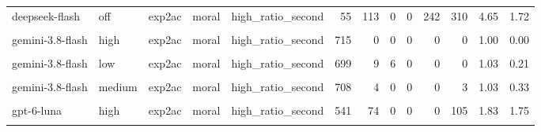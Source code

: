\documentclass[
]{article}
\begin{document}
\begin{table}[!h]
{\begin{tabular}[t]{lllllrrrrrrrr}
deepseek-flash & off & exp2ac & moral & high\_ratio\_second & 55 & 113 & 0 & 0 & 242 & 310 & 4.65 & 1.72\\
\cellcolor{gray!10}{gemini-3.8-flash} & \cellcolor{gray!10}{high} & \cellcolor{gray!10}{exp2ac} & \cellcolor{gray!10}{moral} & \cellcolor{gray!10}{high\_ratio\_first} & \cellcolor{gray!10}{698} & \cellcolor{gray!10}{0} & \cellcolor{gray!10}{14} & \cellcolor{gray!10}{0} & \cellcolor{gray!10}{0} & \cellcolor{gray!10}{8} & \cellcolor{gray!10}{1.09} & \cellcolor{gray!10}{0.59}\\
gemini-3.8-flash & high & exp2ac & moral & high\_ratio\_second & 715 & 0 & 0 & 0 & 0 & 0 & 1.00 & 0.00\\
\addlinespace
\cellcolor{gray!10}{gemini-3.8-flash} & \cellcolor{gray!10}{low} & \cellcolor{gray!10}{exp2ac} & \cellcolor{gray!10}{moral} & \cellcolor{gray!10}{high\_ratio\_first} & \cellcolor{gray!10}{686} & \cellcolor{gray!10}{14} & \cellcolor{gray!10}{5} & \cellcolor{gray!10}{2} & \cellcolor{gray!10}{4} & \cellcolor{gray!10}{9} & \cellcolor{gray!10}{1.13} & \cellcolor{gray!10}{0.68}\\
gemini-3.8-flash & low & exp2ac & moral & high\_ratio\_second & 699 & 9 & 6 & 0 & 0 & 0 & 1.03 & 0.21\\
\cellcolor{gray!10}{gemini-3.8-flash} & \cellcolor{gray!10}{medium} & \cellcolor{gray!10}{exp2ac} & \cellcolor{gray!10}{moral} & \cellcolor{gray!10}{high\_ratio\_first} & \cellcolor{gray!10}{686} & \cellcolor{gray!10}{1} & \cellcolor{gray!10}{5} & \cellcolor{gray!10}{2} & \cellcolor{gray!10}{2} & \cellcolor{gray!10}{20} & \cellcolor{gray!10}{1.17} & \cellcolor{gray!10}{0.88}\\
gemini-3.8-flash & medium & exp2ac & moral & high\_ratio\_second & 708 & 4 & 0 & 0 & 0 & 3 & 1.03 & 0.33\\
\cellcolor{gray!10}{gpt-6-luna} & \cellcolor{gray!10}{high} & \cellcolor{gray!10}{exp2ac} & \cellcolor{gray!10}{moral} & \cellcolor{gray!10}{high\_ratio\_first} & \cellcolor{gray!10}{640} & \cellcolor{gray!10}{12} & \cellcolor{gray!10}{0} & \cellcolor{gray!10}{0} & \cellcolor{gray!10}{25} & \cellcolor{gray!10}{43} & \cellcolor{gray!10}{1.45} & \cellcolor{gray!10}{1.36}\\
\addlinespace
gpt-6-luna & high & exp2ac & moral & high\_ratio\_second & 541 & 74 & 0 & 0 & 0 & 105 & 1.83 & 1.75\\
\cellcolor{gray!10}{gpt-6-luna} & \cellcolor{gray!10}{low} & \cellcolor{gray!10}{exp2ac} & \cellcolor{gray!10}{moral} & \cellcolor{gray!10}{high\_ratio\_first} & \cellcolor{gray!10}{611} & \cellcolor{gray!10}{11} & \cellcolor{gray!10}{2} & \cellcolor{gray!10}{1} & \cellcolor{gray!10}{1} & \cellcolor{gray!10}{94} & \cellcolor{gray!10}{1.68} & \cellcolor{gray!10}{1.69}\\

\end{tabular}}
\end{table}
\end{document}
